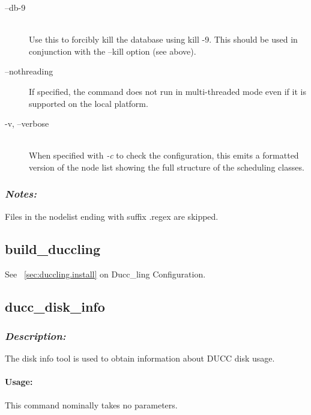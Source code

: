 \begin{description}
    		\item[--db-9] \hfill \\
              Use this to forcibly kill the database using kill -9. This should be used in conjunction with the
              --kill option (see above).

            \item[--nothreading] If specified, the command does not run in multi-threaded mode
              even if it is supported on the local platform.

            \item[-v, --verbose] \hfill \\
              When specified with {\em -c} to check the configuration, this emits a formatted version
              of the node list showing the full structure of the scheduling classes.
              

           \end{description}               

   \subsubsection{{\em Notes:}}
   
      Files in the nodelist ending with suffix .regex are skipped.
            
\subsection{build\_duccling}
\label{subsec:admin.build-duccling}

    See ~\ref{sec:duccling.install} on Ducc\_ling Configuration.


\subsection{ducc\_disk\_info}
\label{subsec:admin.ducc-disk-info}
    \subsubsection{{\em Description:}}

    The disk info tool is used to obtain information about DUCC disk usage. 
    
    \paragraph{Usage:}
        This command nominally takes no parameters.
        
